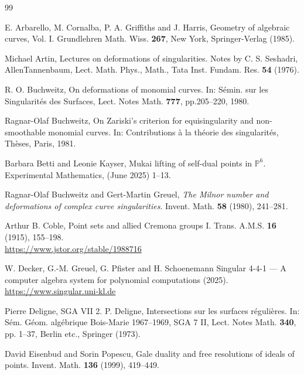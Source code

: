 \documentclass{amsart}
\theoremstyle{definition}
\theoremstyle{remark}
\begin{document}
\begin{thebibliography}{99}

E. Arbarello, M. Cornalba, P. A.  Griffiths and J. Harris,
Geometry of algebraic curves, Vol.  I.
Grundlehren Math. Wiss. {\bf267},
New York, Springer-Verlag (1985).

Michael Artin, 
Lectures on deformations of singularities. Notes by C. S. {Seshadri}, AllenTannenbaum,
Lect. Math. Phys., Math., Tata Inst. Fundam. Res. {\bf54}
(1976).

R. O. Buchweitz,
On deformations of monomial curves. 
In: Sémin. sur les Singularités des Surfaces,  
Lect. Notes Math. {\bf777}, pp.205--220, 1980.


Ragnar-Olaf Buchweitz,
On Zariski's criterion for equisingularity and non-smoothable monomial curves.
In: Contributions à la théorie des singularités, Thèses, Paris, 1981. 

Barbara Betti and Leonie Kayser,
Mukai lifting of self-dual points in $\mathbb{P}^6$.
 Experimental Mathematics,  (June 2025) 1--13. 



Ragnar-Olaf Buchweitz and Gert-Martin Greuel, 
{\sl The Milnor number and deformations of complex curve singularities\/}.
Invent. Math. {\bf58} (1980), 241--281.

Arthur B. Coble,
 Point sets and allied Cremona groups I. Trans. A.M.S. {\bf16} (1915), 155--198.\\
 \url{https://www.jstor.org/stable/1988716}



W. Decker, G.-M. Greuel, G. Pfister and H. Schoenemann 
{\sc Singular} {4-4-1} --- {A} computer algebra system for polynomial computations (2025).
\url {https://www.singular.uni-kl.de} 


Pierre Deligne, SGA VII 2.
P. Deligne, Intersections sur les surfaces régulières.  In: Sém. Géom. algébrique
Bois-Marie 1967–1969, SGA 7 II, Lect. Notes Math. {\bf340}, pp. 1--37,
Berlin etc., Springer (1973).



David Eisenbud and Sorin Popescu, 
Gale duality and free resolutions of ideals of points.
Invent. Math. {\bf136} (1999),  419--449. 


\end{thebibliography}
\end{document}

